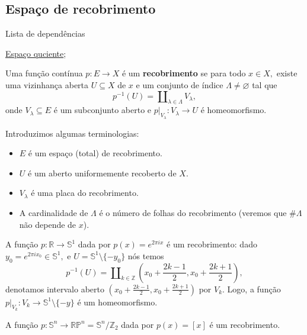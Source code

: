 \subsection{Espaço de recobrimento}
\label{espaco-de-recobrimento-def}
\begin{titlemize}{Lista de dependências}
	\item \hyperref[topologia-quociente]{Espaço quciente};\\ %
\end{titlemize}
\begin{defi}
Uma função contínua $p:E\rightarrow X$ é um \textbf{recobrimento} se para todo $x\in X,$ existe uma vizinhança aberta $U\subseteq X$ de $x$ e um conjunto de índice $\Lambda\ne \varnothing$ tal que 
$$p^{-1}(U)=\amalg_{\lambda\in \Lambda} V_\lambda,$$
onde $V_\lambda\subseteq E$ é um subconjunto aberto e $p|_{V_\lambda}:V_\lambda\rightarrow U$ é homeomorfismo.
\end{defi}

\begin{nota}
Introduzimos algumas terminologias: 
    \begin{itemize}
        \item $E$ é um espaço (total) de recobrimento.
        \item $U$ é um aberto uniformemente recoberto de $X.$
        \item $V_\lambda$ é uma placa do recobrimento.
        \item A cardinalidade de $\Lambda$ é o número de folhas do recobrimento (veremos que $\# \Lambda$ não depende de $x$). 
    \end{itemize}
\end{nota}

\begin{ex}
A função $p:\mathbb{R}\rightarrow \mathbb{S}^1$ dada por $p(x)=e^{2\pi ix}$ é um recobrimento: dado $y_0=e^{2\pi i x_0}\in\mathbb{S}^1,$ e $U=\mathbb{S}^1\setminus \{-y_0\}$ nós temos 
$$p^{-1}(U)=\amalg_{k\in \mathbb{Z}} (x_0+\frac{2k-1}{2},x_0+\frac{2k+1}{2}),$$
denotamos intervalo aberto $(x_0+\frac{2k-1}{2},x_0+\frac{2k+1}{2})$ por $V_k.$ Logo, a função $p|_{V_k}:V_k\rightarrow \mathbb{S}^1\setminus\{-y\}$ é um homeomorfismo.
\end{ex}

\begin{ex}
    A função $p:\mathbb{S}^n\rightarrow \mathbb{RP}^n=\mathbb{S}^n/\mathbb{Z}_2$ dada por $p(x)=[x]$ é um recobrimento.
\end{ex}

